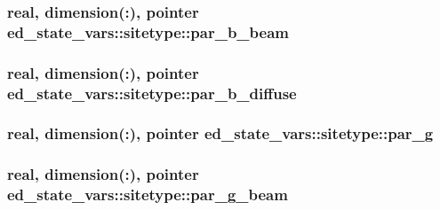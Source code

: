 \subsubsection[{\texorpdfstring{par\+\_\+b\+\_\+beam}{par_b_beam}}]{\setlength{\rightskip}{0pt plus 5cm}real, dimension(\+:), pointer ed\+\_\+state\+\_\+vars\+::sitetype\+::par\+\_\+b\+\_\+beam}\hypertarget{structed__state__vars_1_1sitetype_ae01b420c1733e280dbe174724128e5a5}{}\label{structed__state__vars_1_1sitetype_ae01b420c1733e280dbe174724128e5a5}
\subsubsection[{\texorpdfstring{par\+\_\+b\+\_\+diffuse}{par_b_diffuse}}]{\setlength{\rightskip}{0pt plus 5cm}real, dimension(\+:), pointer ed\+\_\+state\+\_\+vars\+::sitetype\+::par\+\_\+b\+\_\+diffuse}\hypertarget{structed__state__vars_1_1sitetype_ab96565393d209d34d568dcbaefb9f532}{}\label{structed__state__vars_1_1sitetype_ab96565393d209d34d568dcbaefb9f532}
\subsubsection[{\texorpdfstring{par\+\_\+g}{par_g}}]{\setlength{\rightskip}{0pt plus 5cm}real, dimension(\+:), pointer ed\+\_\+state\+\_\+vars\+::sitetype\+::par\+\_\+g}\hypertarget{structed__state__vars_1_1sitetype_a3b8fadf78414b3f3bb89968a7a634223}{}\label{structed__state__vars_1_1sitetype_a3b8fadf78414b3f3bb89968a7a634223}
\subsubsection[{\texorpdfstring{par\+\_\+g\+\_\+beam}{par_g_beam}}]{\setlength{\rightskip}{0pt plus 5cm}real, dimension(\+:), pointer ed\+\_\+state\+\_\+vars\+::sitetype\+::par\+\_\+g\+\_\+beam}\hypertarget{structed__state__vars_1_1sitetype_ad74c013bc0942fb9c933da4433347fa1}{}\label{structed__state__vars_1_1sitetype_ad74c013bc0942fb9c933da4433347fa1}
